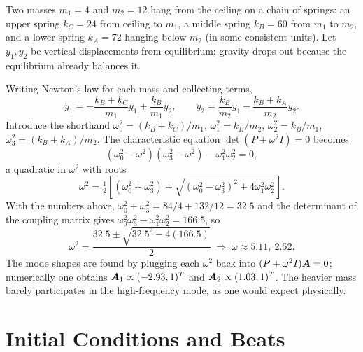 \begin{example}
Two masses $m_1 = 4$ and $m_2 = 12$ hang from the ceiling on a chain of springs: an upper spring $k_C = 24$ from ceiling to $m_1$, a middle spring $k_B = 60$ from $m_1$ to $m_2$, and a lower spring $k_A = 72$ hanging below $m_2$ (in some consistent units). Let $y_1, y_2$ be vertical displacements from equilibrium; gravity drops out because the equilibrium already balances it.

Writing Newton's law for each mass and collecting terms,
\begin{equation}
    \ddot{y}_1 = -\frac{k_B + k_C}{m_1} y_1 + \frac{k_B}{m_1} y_2, \qquad
    \ddot{y}_2 = \frac{k_B}{m_2} y_1 - \frac{k_B + k_A}{m_2} y_2.
\end{equation}
Introduce the shorthand $\omega_0^2 = (k_B+k_C)/m_1$, $\omega_1^2 = k_B/m_2$, $\omega_2^2 = k_B/m_1$, $\omega_3^2 = (k_B+k_A)/m_2$. The characteristic equation $\det(P + \omega^2 I) = 0$ becomes
\begin{equation}
    (\omega_0^2 - \omega^2)(\omega_3^2 - \omega^2) - \omega_1^2 \omega_2^2 = 0,
\end{equation}
a quadratic in $\omega^2$ with roots
\begin{equation}
    \omega^2 = \tfrac{1}{2}\!\left[(\omega_0^2 + \omega_3^2) \pm \sqrt{(\omega_0^2 - \omega_3^2)^2 + 4\omega_1^2 \omega_2^2}\right].
\end{equation}
With the numbers above, $\omega_0^2 + \omega_3^2 = 84/4 + 132/12 = 32.5$ and the determinant of the coupling matrix gives $\omega_0^2 \omega_3^2 - \omega_1^2 \omega_2^2 = 166.5$, so
\begin{equation}
    \omega^2 = \frac{32.5 \pm \sqrt{32.5^2 - 4(166.5)}}{2} \;\Longrightarrow\; \omega \approx 5.11,\ 2.52.
\end{equation}
The mode shapes are found by plugging each $\omega^2$ back into $(P + \omega^2 I)\vect{A} = 0$; numerically one obtains $\vect{A}_1 \propto (-2.93, 1)^T$ and $\vect{A}_2 \propto (1.03, 1)^T$. The heavier mass barely participates in the high-frequency mode, as one would expect physically.
\end{example}

\section{Initial Conditions and Beats}

